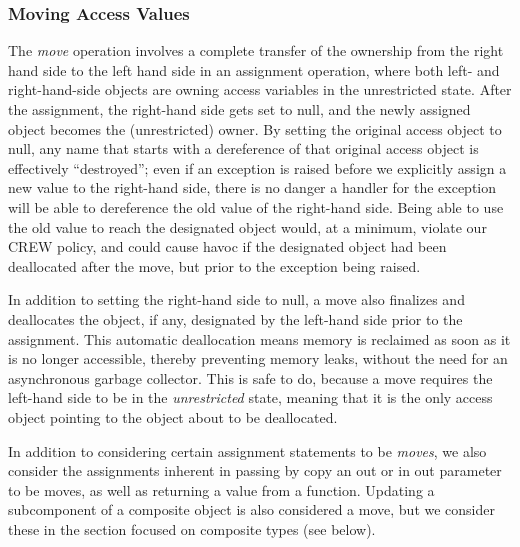 \documentclass{llncs}
\newcommand{\keyword}[1]{\textsf{#1}}
\begin{document}
\subsubsection{Moving Access Values}
\label{sec:moving}

The \textit{move} operation involves a complete transfer of the ownership from the right hand side to the left hand side in an assignment operation, where both left- and right-hand-side objects are owning access variables in the unrestricted state.
After the assignment, the right-hand side gets set to null, and the newly assigned object becomes the (unrestricted) owner. By setting the original access object to null, any name that starts with a dereference of
that original access object is effectively ``destroyed'';  even if an exception is raised before we explicitly assign a new value to the right-hand side, there is no danger a handler for the exception will
be able to dereference the old value of the right-hand side.  Being able to use the old value to reach the designated object would, at a minimum, violate our CREW policy, and could cause havoc if the designated object had been deallocated after the move, but prior to the exception being raised.


In addition to setting the right-hand side to null, a move also finalizes and deallocates the object, if any, designated by the
left-hand side prior to the assignment.  This automatic deallocation means memory is reclaimed as soon as it is
no longer accessible, thereby preventing memory leaks, without the need for an asynchronous garbage collector.
This is safe to do, because a move requires the left-hand side to be in the \textit{unrestricted} state, meaning that
it is the only access object pointing to the object about to be deallocated.


In addition to considering certain assignment statements to be \textit{moves}, we also consider the assignments 
inherent in passing by copy an \keyword{out} or \keyword{in out} parameter to be moves, as well
as returning a value from a function.
Updating a subcomponent of a composite object is also considered a move, but
we consider these in the section focused on composite types (see below).
\end{document}
